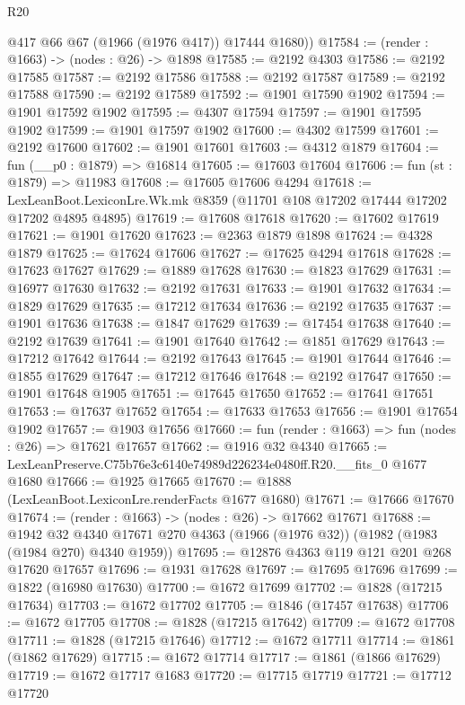 \begin{lexlean}{R20}
\begin{coremodule}
        @417
        @66
        @67
        (@1966 (@1976 @417))
        @17444
        @1680))
@17584 := (render : @1663) -> (nodes : @26) -> @1898
@17585 := @2192 @4303
@17586 := @2192 @17585
@17587 := @2192 @17586
@17588 := @2192 @17587
@17589 := @2192 @17588
@17590 := @2192 @17589
@17592 := @1901 @17590 @1902
@17594 := @1901 @17592 @1902
@17595 := @4307 @17594
@17597 := @1901 @17595 @1902
@17599 := @1901 @17597 @1902
@17600 := @4302 @17599
@17601 := @2192 @17600
@17602 := @1901 @17601
@17603 := @4312 @1879
@17604 := fun (__p0 : @1879) => @16814
@17605 := @17603 @17604
@17606 := fun (st : @1879) => @11983
@17608 := @17605 @17606 @4294
@17618 := LexLeanBoot.LexiconLre.Wk.mk @8359 (@11701 @108 @17202 @17444 @17202 @17202 @4895 @4895)
@17619 := @17608 @17618
@17620 := @17602 @17619
@17621 := @1901 @17620
@17623 := @2363 @1879 @1898
@17624 := @4328 @1879
@17625 := @17624 @17606
@17627 := @17625 @4294 @17618
@17628 := @17623 @17627
@17629 := @1889 @17628
@17630 := @1823 @17629
@17631 := @16977 @17630
@17632 := @2192 @17631
@17633 := @1901 @17632
@17634 := @1829 @17629
@17635 := @17212 @17634
@17636 := @2192 @17635
@17637 := @1901 @17636
@17638 := @1847 @17629
@17639 := @17454 @17638
@17640 := @2192 @17639
@17641 := @1901 @17640
@17642 := @1851 @17629
@17643 := @17212 @17642
@17644 := @2192 @17643
@17645 := @1901 @17644
@17646 := @1855 @17629
@17647 := @17212 @17646
@17648 := @2192 @17647
@17650 := @1901 @17648 @1905
@17651 := @17645 @17650
@17652 := @17641 @17651
@17653 := @17637 @17652
@17654 := @17633 @17653
@17656 := @1901 @17654 @1902
@17657 := @1903 @17656
@17660 := fun (render : @1663) => fun (nodes : @26) => @17621 @17657
@17662 := @1916 @32 @4340
@17665 := LexLeanPreserve.C75b76e3c6140e74989d226234e0480ff.R20.__fits_0 @1677 @1680
@17666 := @1925 @17665
@17670 := @1888 (LexLeanBoot.LexiconLre.renderFacts @1677 @1680)
@17671 := @17666 @17670
@17674 := (render : @1663) -> (nodes : @26) -> @17662 @17671
@17688 := @1942
    @32
    @4340
    @17671
    @270
    @4363
    (@1966 (@1976 @32))
    (@1982 (@1983 (@1984 @270) @4340 @1959))
@17695 := @12876 @4363 @119 @121 @201 @268 @17620 @17657
@17696 := @1931 @17628
@17697 := @17695 @17696
@17699 := @1822 (@16980 @17630)
@17700 := @1672 @17699
@17702 := @1828 (@17215 @17634)
@17703 := @1672 @17702
@17705 := @1846 (@17457 @17638)
@17706 := @1672 @17705
@17708 := @1828 (@17215 @17642)
@17709 := @1672 @17708
@17711 := @1828 (@17215 @17646)
@17712 := @1672 @17711
@17714 := @1861 (@1862 @17629)
@17715 := @1672 @17714
@17717 := @1861 (@1866 @17629)
@17719 := @1672 @17717 @1683
@17720 := @17715 @17719
@17721 := @17712 @17720

\end{coremodule}
\end{lexlean}
